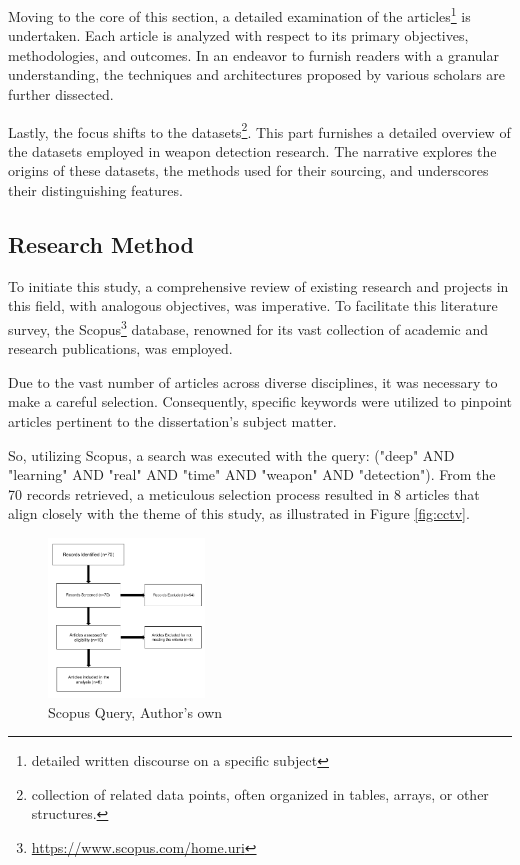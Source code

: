 Moving to the core of this section, a detailed examination of the articles\footnote{detailed written discourse on a specific subject} is undertaken. Each article is analyzed with respect to its primary objectives, methodologies, and outcomes. In an endeavor to furnish readers with a granular understanding, the techniques and architectures proposed by various scholars are further dissected.

Lastly, the focus shifts to the datasets\footnote{collection of related data points, often organized in tables, arrays, or other structures.}. This part furnishes a detailed overview of the datasets employed in weapon detection research. The narrative explores the origins of these datasets, the methods used for their sourcing, and underscores their distinguishing features.

\subsection{Research Method}
To initiate this study, a comprehensive review of existing research and projects in this field, with analogous objectives, was imperative. To facilitate this literature survey, the Scopus\footnote{\url{https://www.scopus.com/home.uri}} database, renowned for its vast collection of academic and research publications, was employed.

Due to the vast number of articles across diverse disciplines, it was necessary to make a careful selection. Consequently, specific keywords were utilized to pinpoint articles pertinent to the dissertation's subject matter.

So, utilizing Scopus, a search was executed with the query: ("deep" AND "learning" AND "real" AND "time" AND "weapon" AND "detection"). From the 70 records retrieved, a meticulous selection process resulted in 8 articles that align closely with the theme of this study, as illustrated in Figure \ref{fig:cctv}.

\begin{figure}[h]
    \centering 
    \includegraphics[width=0.37\textwidth]{figs/scopus.png} 
    \caption{Scopus Query, Author's own}
    \label{fig:scopus_query}
\end{figure}

